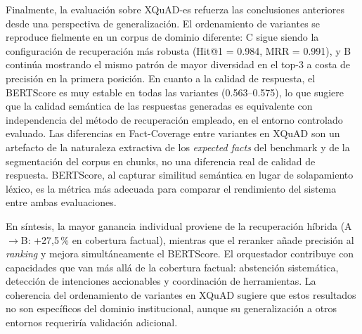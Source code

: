 Finalmente, la evaluación sobre XQuAD-es refuerza las conclusiones anteriores desde una perspectiva de generalización. 
El ordenamiento de variantes se reproduce fielmente en un corpus de dominio diferente: C sigue siendo la configuración de recuperación más robusta (Hit@1 = 0.984, MRR = 0.991), y B continúa mostrando el mismo patrón de mayor diversidad en el top-3 a costa de precisión en la primera posición. 
En cuanto a la calidad de respuesta, el BERTScore es muy estable en todas las variantes (0.563–0.575), lo que sugiere que la calidad semántica de las respuestas generadas es equivalente con independencia del método de recuperación empleado, en el entorno controlado evaluado. 
Las diferencias en Fact-Coverage entre variantes en XQuAD son un artefacto de la naturaleza extractiva de los \textit{expected facts} del benchmark y de la segmentación del corpus en chunks, no una diferencia real de calidad de respuesta. 
BERTScore, al capturar similitud semántica en lugar de solapamiento léxico, es la métrica más adecuada para comparar el rendimiento del sistema entre ambas evaluaciones.

En síntesis, la mayor ganancia individual proviene de la recuperación híbrida (A$\to$B: +27,5\,\% en cobertura factual), mientras que el reranker añade precisión al \textit{ranking} y mejora simultáneamente el BERTScore. 
El orquestador contribuye con capacidades que van más allá de la cobertura factual: abstención sistemática, detección de intenciones accionables y coordinación de herramientas. 
La coherencia del ordenamiento de variantes en XQuAD sugiere que estos resultados no son específicos del dominio institucional, aunque su generalización a otros entornos requeriría validación adicional.
